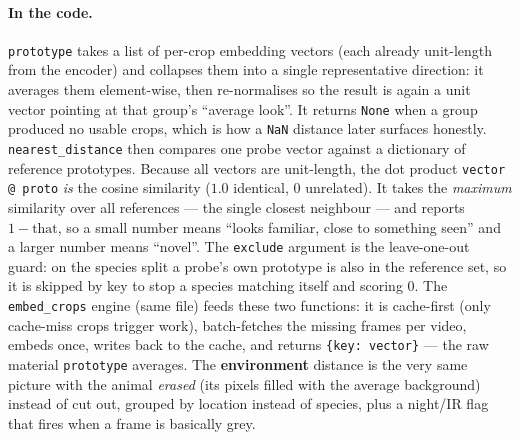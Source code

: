 \documentclass[11pt,a4paper]{article}
\newcommand{\code}[1]{\texttt{#1}}
\begin{document}
\paragraph{In the code.}
\code{prototype} takes a list of per-crop embedding vectors (each already unit-length from the encoder) and
collapses them into a single representative direction: it averages them element-wise, then re-normalises so
the result is again a unit vector pointing at that group's ``average look''. It returns \code{None} when a
group produced no usable crops, which is how a \code{NaN} distance later surfaces honestly.
\code{nearest\_distance} then compares one probe vector against a dictionary of reference prototypes. Because
all vectors are unit-length, the dot product \code{vector @ proto} \emph{is} the cosine similarity ($1.0$
identical, $0$ unrelated). It takes the \emph{maximum} similarity over all references --- the single closest
neighbour --- and reports $1 - \text{that}$, so a small number means ``looks familiar, close to something
seen'' and a larger number means ``novel''. The \code{exclude} argument is the leave-one-out guard: on the
species split a probe's own prototype is also in the reference set, so it is skipped by key to stop a species
matching itself and scoring $0$. The \code{embed\_crops} engine (same file) feeds these two functions: it is
cache-first (only cache-miss crops trigger work), batch-fetches the missing frames per video, embeds once,
writes back to the cache, and returns \code{\{key: vector\}} --- the raw material \code{prototype} averages.
The \textbf{environment} distance is the very same picture with the animal \emph{erased} (its pixels filled
with the average background) instead of cut out, grouped by location instead of species, plus a night/IR
flag that fires when a frame is basically grey.
\end{document}
